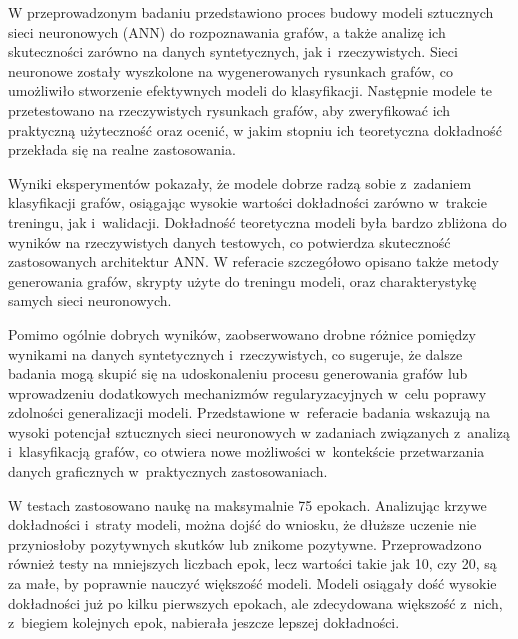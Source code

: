
W przeprowadzonym badaniu przedstawiono proces budowy modeli sztucznych sieci neuronowych (ANN) do rozpoznawania grafów,
a także analizę ich skuteczności zarówno na danych syntetycznych, jak i~rzeczywistych.
Sieci neuronowe zostały wyszkolone na wygenerowanych rysunkach grafów,
co umożliwiło stworzenie efektywnych modeli do klasyfikacji.
Następnie modele te przetestowano na rzeczywistych rysunkach grafów,
aby zweryfikować ich praktyczną użyteczność oraz ocenić,
w jakim stopniu ich teoretyczna dokładność przekłada się na realne zastosowania.

Wyniki eksperymentów pokazały, że modele dobrze radzą sobie z~zadaniem klasyfikacji grafów,
osiągając wysokie wartości dokładności zarówno w~trakcie treningu, jak i~walidacji.
Dokładność teoretyczna modeli była bardzo zbliżona do wyników na rzeczywistych danych testowych,
co potwierdza skuteczność zastosowanych architektur ANN.
W referacie szczegółowo opisano także metody generowania grafów,
skrypty użyte do treningu modeli, oraz charakterystykę samych sieci neuronowych.

Pomimo ogólnie dobrych wyników,
zaobserwowano drobne różnice pomiędzy wynikami na danych syntetycznych i~rzeczywistych,
co sugeruje, że dalsze badania mogą skupić się na udoskonaleniu procesu generowania grafów
lub wprowadzeniu dodatkowych mechanizmów regularyzacyjnych w~celu poprawy zdolności generalizacji modeli.
Przedstawione w~referacie badania wskazują na wysoki potencjał sztucznych sieci neuronowych
w zadaniach związanych z~analizą i~klasyfikacją grafów,
co otwiera nowe możliwości w~kontekście przetwarzania danych graficznych w~praktycznych zastosowaniach.

W testach zastosowano naukę na maksymalnie 75 epokach.
Analizując krzywe dokładności i~straty modeli, można dojść do wniosku,
że dłuższe uczenie nie przyniosłoby pozytywnych skutków lub znikome pozytywne.
Przeprowadzono również testy na mniejszych liczbach epok, lecz wartości takie jak 10, czy 20,
są za małe, by poprawnie nauczyć większość modeli.
Modeli osiągały dość wysokie dokładności już po kilku pierwszych epokach,
ale zdecydowana większość z~nich, z~biegiem kolejnych epok, nabierała jeszcze lepszej dokładności.

